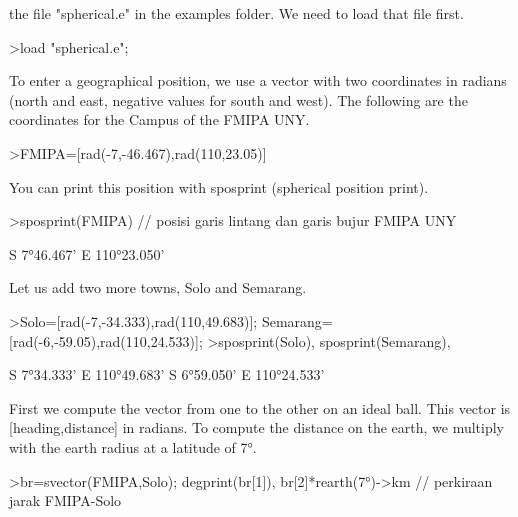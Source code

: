 \documentclass[a4paper,10pt]{article}
\begin{document}
\begin{eulernotebook}
\begin{eulercomment}
\begin{eulercomment}
\begin{eulercomment}
\begin{eulercomment}
\begin{eulercomment}
\begin{eulercomment}
\begin{eulercomment}
the file "spherical.e" in the examples folder. We need to load that file first.
\end{eulercomment}
\begin{eulerprompt}
>load "spherical.e";
\end{eulerprompt}
\begin{eulercomment}
To enter a geographical position, we use a vector with two coordinates in radians (north and
east, negative values for south and west). The following are the coordinates for the Campus
of the FMIPA UNY.
\end{eulercomment}
\begin{eulerprompt}
>FMIPA=[rad(-7,-46.467),rad(110,23.05)]
\end{eulerprompt}
\begin{euleroutput}
  [-0.13569,  1.92657]
\end{euleroutput}
\begin{eulercomment}
You can print this position with sposprint (spherical position print).
\end{eulercomment}
\begin{eulerprompt}
>sposprint(FMIPA) // posisi garis lintang dan garis bujur FMIPA UNY
\end{eulerprompt}
\begin{euleroutput}
  S 7°46.467' E 110°23.050'
\end{euleroutput}
\begin{eulercomment}
Let us add two more towns, Solo and Semarang.
\end{eulercomment}
\begin{eulerprompt}
>Solo=[rad(-7,-34.333),rad(110,49.683)]; Semarang=[rad(-6,-59.05),rad(110,24.533)];
>sposprint(Solo), sposprint(Semarang),
\end{eulerprompt}
\begin{euleroutput}
  S 7°34.333' E 110°49.683'
  S 6°59.050' E 110°24.533'
\end{euleroutput}
\begin{eulercomment}
First we compute the vector from one to the other on an ideal ball. This vector is
[heading,distance] in radians. To compute the distance on the earth, we multiply with the
earth radius at a latitude of 7°.
\end{eulercomment}
\begin{eulerprompt}
>br=svector(FMIPA,Solo); degprint(br[1]), br[2]*rearth(7°)->km // perkiraan jarak FMIPA-Solo
\end{eulerprompt}
\begin{euleroutput}

\end{euleroutput}
\end{eulercomment}
\end{eulercomment}
\end{eulercomment}
\end{eulercomment}
\end{eulercomment}
\end{eulercomment}
\end{eulernotebook}
\end{document}
